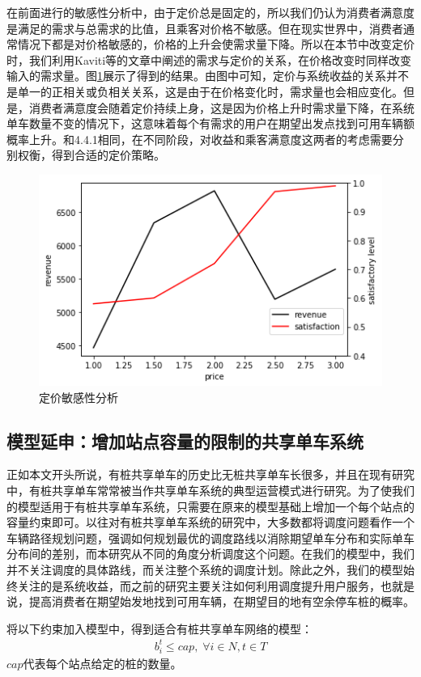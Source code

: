 \documentclass[]{tongjithesis}
\numberwithin{equation}{chapter}
\begin{document}
在前面进行的敏感性分析中，由于定价总是固定的，所以我们仍认为消费者满意度是满足的需求与总需求的比值，且乘客对价格不敏感。但在现实世界中，消费者通常情况下都是对价格敏感的，价格的上升会使需求量下降。所以在本节中改变定价时，我们利用Kaviti等的文章中阐述的需求与定价的关系\cite{kaviti2019assessing}，在价格改变时同样改变输入的需求量。图\ref{sens_price}展示了得到的结果。由图中可知，定价与系统收益的关系并不是单一的正相关或负相关关系，这是由于在价格变化时，需求量也会相应变化。但是，消费者满意度会随着定价持续上身，这是因为价格上升时需求量下降，在系统单车数量不变的情况下，这意味着每个有需求的用户在期望出发点找到可用车辆额概率上升。和4.4.1相同，在不同阶段，对收益和乘客满意度这两者的考虑需要分别权衡，得到合适的定价策略。
\begin{figure}[H]
    \centering
    \includegraphics[width=0.7 \textwidth]{figures_main/sensitivity_price.png}
    \caption{定价敏感性分析}
    \label{sens_price}
\end{figure}

\subsection{模型延申：增加站点容量的限制的共享单车系统}
正如本文开头所说，有桩共享单车的历史比无桩共享单车长很多，并且在现有研究中，有桩共享单车常常被当作共享单车系统的典型运营模式进行研究。为了使我们的模型适用于有桩共享单车系统，只需要在原来的模型基础上增加一个每个站点的容量约束即可。以往对有桩共享单车系统的研究中，大多数都将调度问题看作一个车辆路径规划问题，强调如何规划最优的调度路线以消除期望单车分布和实际单车分布间的差别\cite{chemla2013bike,liu2016rebalancing,pfrommer2014dynamic}，而本研究从不同的角度分析调度这个问题。在我们的模型中，我们并不关注调度的具体路线，而关注整个系统的调度计划。除此之外，我们的模型始终关注的是系统收益，而之前的研究主要关注如何利用调度提升用户服务，也就是说，提高消费者在期望始发地找到可用车辆，在期望目的地有空余停车桩的概率。

将以下约束加入模型中，得到适合有桩共享单车网络的模型：
\begin{align}
    {b_{i}^{t}}{\leq cap, \;  \forall i\in N, t \in T}
\end{align}
\noindent
$cap$代表每个站点给定的桩的数量。
\end{document}
